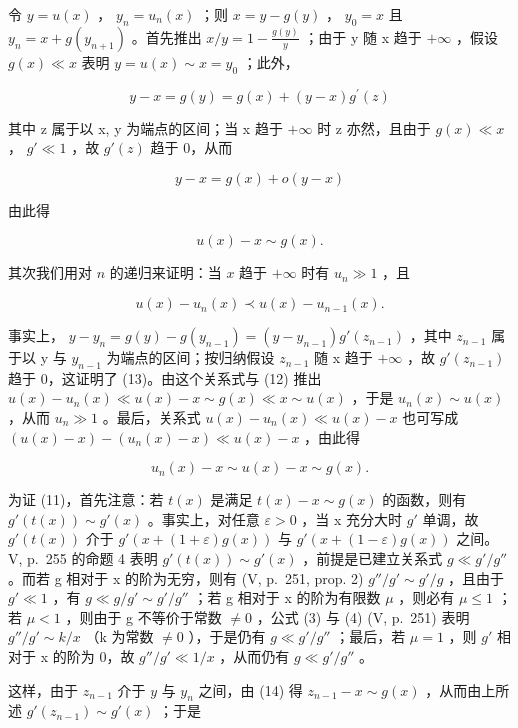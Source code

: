 令 \(y = u(x)\) ， \(y_{n} = u_{n}(x)\) ；则 \(x = y - g(y)\) ， \(y_{0} = x\) 且 \(y_{n} = x + g(y_{n+1})\) 。首先推出 \(x/y = 1 - \frac{g(y)}{y}\) ；由于 y 随 x 趋于 \(+\infty\) ，假设 \(g(x) \ll x\) 表明 \(y = u(x) \sim x = y_{0}\) ；此外，

\[
y - x = g (y) = g (x) + (y - x) g ^ {\prime} (z)
\]

其中 z 属于以 x, y 为端点的区间；当 x 趋于 \(+\infty\) 时 z 亦然，且由于 \(g(x) \ll x\) ， \(g' \ll 1\) ，故 \(g'(z)\) 趋于 0，从而

\[
y - x = g (x) + o (y - x)
\]

由此得

\[
u (x) - x \sim g (x).\tag{12}
\]

其次我们用对 \(n\) 的递归来证明：当 \(x\) 趋于 \(+\infty\) 时有 \(u_{n} \gg 1\) ，且

\[
u (x) - u _ {n} (x) \prec u (x) - u _ {n - 1} (x).\tag{13}
\]

事实上， \(y - y_{n} = g(y) - g(y_{n-1}) = (y - y_{n-1})g'(z_{n-1})\) ，其中 \(z_{n-1}\) 属于以 y 与 \(y_{n-1}\) 为端点的区间；按归纳假设 \(z_{n-1}\) 随 x 趋于 \(+\infty\) ，故 \(g'(z_{n-1})\) 趋于 0，这证明了 (13)。由这个关系式与 (12) 推出 \(u(x) - u_{n}(x) \ll u(x) - x \sim g(x) \ll x \sim u(x)\) ，于是 \(u_{n}(x) \sim u(x)\) ，从而 \(u_{n} \gg 1\) 。最后，关系式 \(u(x) - u_{n}(x) \ll u(x) - x\) 也可写成 \((u(x) - x) - (u_{n}(x) - x) \ll u(x) - x\) ，由此得

\[
u _ {n} (x) - x \sim u (x) - x \sim g (x).\tag{14}
\]

为证 (11)，首先注意：若 \(t(x)\) 是满足 \(t(x) - x \sim g(x)\) 的函数，则有 \(g'(t(x)) \sim g'(x)\) 。事实上，对任意 \(\varepsilon > 0\) ，当 x 充分大时 \(g'\) 单调，故 \(g'(t(x))\) 介于 \(g'(x + (1 + \varepsilon)g(x))\) 与 \(g'(x + (1 - \varepsilon)g(x))\) 之间。V, p.~255 的命题 4 表明 \(g'(t(x)) \sim g'(x)\) ，前提是已建立关系式 \(g \ll g'/g''\) 。而若 g 相对于 x 的阶为无穷，则有 (V, p.~251, prop. 2) \(g''/g' \sim g'/g\) ，且由于 \(g' \ll 1\) ，有 \(g \ll g/g' \sim g'/g''\) ；若 g 相对于 x 的阶为有限数 \(\mu\) ，则必有 \(\mu \leqslant 1\) ；若 \(\mu < 1\) ，则由于 g 不等价于常数 \(\neq 0\) ，公式 (3) 与 (4) (V, p.~251) 表明 \(g''/g' \sim k/x\) （k 为常数 \(\neq 0\) ），于是仍有 \(g \ll g'/g''\) ；最后，若 \(\mu = 1\) ，则 \(g'\) 相对于 x 的阶为 0，故 \(g''/g' \ll 1/x\) ，从而仍有 \(g \ll g'/g''\) 。

这样，由于 \(z_{n-1}\) 介于 \(y\) 与 \(y_n\) 之间，由 (14) 得 \(z_{n-1} - x \sim g(x)\) ，从而由上所述 \(g'(z_{n-1}) \sim g'(x)\) ；于是

